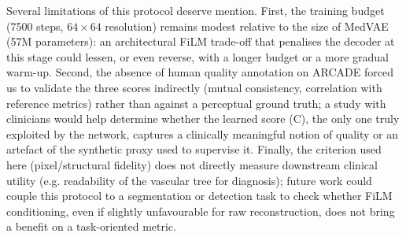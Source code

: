 \documentclass[conference]{IEEEtran}
\begin{document}
Several limitations of this protocol deserve mention. First, the training
budget (7500 steps, $64\times64$ resolution) remains modest relative to
the size of MedVAE (57M parameters): an architectural FiLM trade-off that
penalises the decoder at this stage could lessen, or even reverse, with a
longer budget or a more gradual warm-up. Second, the absence of human
quality annotation on ARCADE forced us to validate the three scores
indirectly (mutual consistency, correlation with reference metrics)
rather than against a perceptual ground truth; a study with clinicians
would help determine whether the learned score (C), the only one truly
exploited by the network, captures a clinically meaningful notion of
quality or an artefact of the synthetic proxy used to supervise it.
Finally, the criterion used here (pixel/structural fidelity) does not
directly measure downstream clinical utility (e.g. readability of the
vascular tree for diagnosis); future work could couple this protocol to a
segmentation or detection task to check whether FiLM conditioning, even
if slightly unfavourable for raw reconstruction, does not bring a benefit
on a task-oriented metric.
\end{document}
